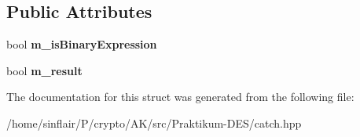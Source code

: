\subsection*{Public Attributes}
\begin{DoxyCompactItemize}
\item 
\mbox{\label{structCatch_1_1ITransientExpression_a75ce48da824d514d08152d396abb28d8}} 
bool {\bfseries m\+\_\+is\+Binary\+Expression}
\item 
\mbox{\label{structCatch_1_1ITransientExpression_a4646e2b5e0156e913653ec3b9b60c942}} 
bool {\bfseries m\+\_\+result}
\end{DoxyCompactItemize}


The documentation for this struct was generated from the following file\+:\begin{DoxyCompactItemize}
\item 
/home/sinflair/\+P/crypto/\+A\+K/src/\+Praktikum-\/\+D\+E\+S/catch.\+hpp\end{DoxyCompactItemize}
